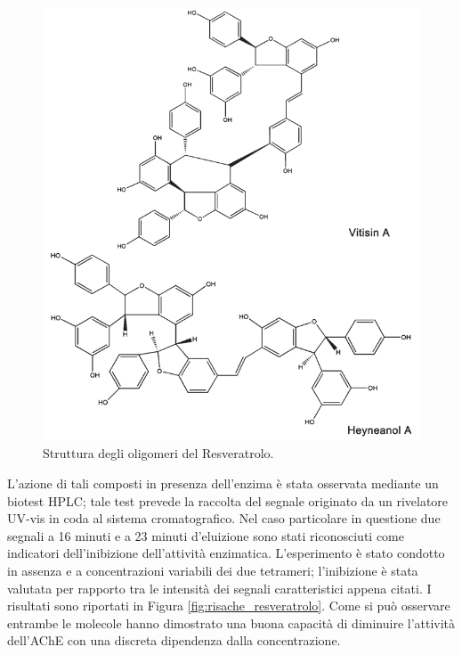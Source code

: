 \documentclass[a4paper, 12pt]{article}
\begin{document}
\begin{figure}[H]
	\centering
	\includegraphics[width=\linewidth]{immagini/oly_resveratrolo.png}
	\caption{Struttura degli oligomeri del Resveratrolo.}
	\label{fig:oly_resveratrolo}
\end{figure}

L'azione di tali composti in presenza dell'enzima è stata osservata mediante un biotest HPLC; tale test prevede la raccolta del segnale originato da un rivelatore UV-vis in coda al sistema cromatografico. Nel caso particolare in questione due segnali a 16 minuti e a 23 minuti d'eluizione sono stati riconosciuti come indicatori dell'inibizione dell'attività enzimatica. L'esperimento è stato condotto in assenza e a concentrazioni variabili dei due tetrameri; l'inibizione è stata valutata per rapporto tra le intensità dei segnali caratteristici appena citati.  I risultati sono riportati in Figura \ref{fig:risache_resveratrolo}. Come si può osservare entrambe le molecole hanno dimostrato una buona capacità di diminuire l'attività dell'AChE con una discreta dipendenza dalla concentrazione.
\end{document}
